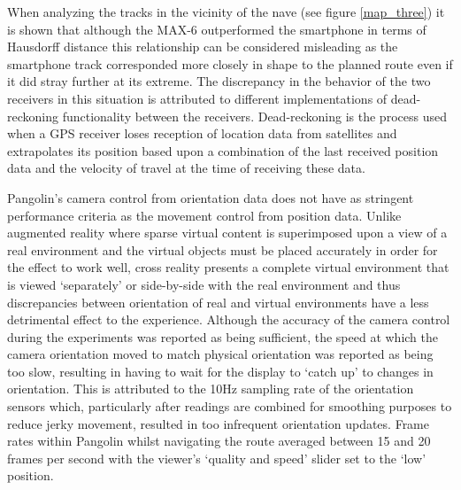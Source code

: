 
When analyzing the tracks in the vicinity of the nave (see figure \ref{map_three}) it is shown that although the MAX-6 outperformed the smartphone in terms of Hausdorff distance this relationship can be considered misleading as the smartphone track corresponded more closely in shape to the planned route even if it did stray further at its extreme. The discrepancy in the behavior of the two receivers in this situation is attributed to different implementations of dead-reckoning functionality between the receivers. Dead-reckoning is the process used when a GPS receiver loses reception of location data from satellites and extrapolates its position based upon a combination of the last received position data and the velocity of travel at the time of receiving these data.
 

Pangolin's camera control from orientation data does not have as stringent performance criteria as the movement control from position data. Unlike augmented reality where sparse virtual content is superimposed upon a view of a real environment and the virtual objects must be placed accurately in order for the effect to work well, cross reality presents a complete virtual environment that is viewed `separately' or side-by-side with the real environment and thus discrepancies between orientation of real and virtual environments have a less detrimental effect to the experience. Although the accuracy of the camera control during the experiments was reported as being sufficient, the speed at which the camera orientation moved to match physical orientation was reported as being too slow, resulting in having to wait for the display to `catch up' to changes in orientation. This is attributed to the 10Hz sampling rate of the orientation sensors which, particularly after readings are combined for smoothing purposes to reduce jerky movement, resulted in too infrequent orientation updates. Frame rates within Pangolin whilst navigating the route averaged between 15 and 20 frames per second with the viewer's `quality and speed' slider set to the `low' position.

